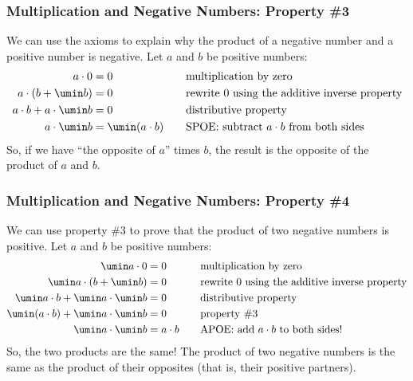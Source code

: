 \subsubsection{Multiplication and Negative Numbers: Property \#3}
We can use the axioms to explain why the product of a negative number and a positive number is negative. Let $a$ and $b$ be positive numbers:
\[\begin{aligned}
a \cdot 0 &= 0
&& \quad\text{multiplication by zero}
\\
a \cdot (b + \umin b) &= 0
&& \quad\text{rewrite 0 using the additive inverse property}
\\
a \cdot b + a \cdot \umin b &= 0
&& \quad\text{distributive property}
\\
a \cdot \umin b &= \umin (a \cdot b)
&& \quad\text{SPOE: subtract $a \cdot b$ from both sides}
\end{aligned}\]
So, if we have ``the opposite of $a$'' times $b$, the result is the opposite of the product of $a$ and $b$.

\subsubsection{Multiplication and Negative Numbers: Property \#4}
We can use property \#3 to prove that the product of two negative numbers is positive. Let $a$ and $b$ be positive numbers:
\[\begin{aligned}
\umin a \cdot 0 &= 0
&& \quad\text{multiplication by zero}
\\
\umin a \cdot (b + \umin b) &= 0
&& \quad\text{rewrite 0 using the additive inverse property}
\\
\umin a \cdot b + \umin a \cdot \umin b &= 0
&& \quad\text{distributive property}
\\
\umin (a \cdot b) + \umin a \cdot \umin b &= 0
&& \quad\text{property \#3}
\\
\umin a \cdot \umin b &= a\cdot b
&& \quad\text{APOE: add $a\cdot b$ to both sides!}
\end{aligned}\]
So, the two products are the same! The product of two negative numbers is the same as the product of their opposites (that is, their positive partners).

